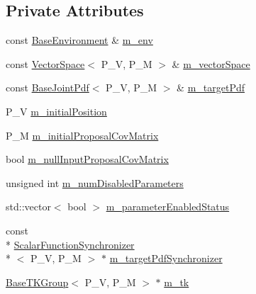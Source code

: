 \subsection*{Private Attributes}
\begin{DoxyCompactItemize}
\item 
const \hyperlink{class_q_u_e_s_o_1_1_base_environment}{Base\-Environment} \& \hyperlink{class_q_u_e_s_o_1_1_metropolis_hastings_s_g_ac8ea061e55b920e0c8f9bce5c3f20e52}{m\-\_\-env}
\item 
const \hyperlink{class_q_u_e_s_o_1_1_vector_space}{Vector\-Space}$<$ P\-\_\-\-V, P\-\_\-\-M $>$ \& \hyperlink{class_q_u_e_s_o_1_1_metropolis_hastings_s_g_a2ef17fbfc6a156f03bbfad044b5a75f5}{m\-\_\-vector\-Space}
\item 
const \hyperlink{class_q_u_e_s_o_1_1_base_joint_pdf}{Base\-Joint\-Pdf}$<$ P\-\_\-\-V, P\-\_\-\-M $>$ \& \hyperlink{class_q_u_e_s_o_1_1_metropolis_hastings_s_g_a42ce4ffcb3addf62dd3f19fe8bb09268}{m\-\_\-target\-Pdf}
\item 
P\-\_\-\-V \hyperlink{class_q_u_e_s_o_1_1_metropolis_hastings_s_g_ae29f5d1198228858283d733021da2b14}{m\-\_\-initial\-Position}
\item 
P\-\_\-\-M \hyperlink{class_q_u_e_s_o_1_1_metropolis_hastings_s_g_a4d9862afbafb34921e91de3d4610c6cd}{m\-\_\-initial\-Proposal\-Cov\-Matrix}
\item 
bool \hyperlink{class_q_u_e_s_o_1_1_metropolis_hastings_s_g_a416c5ed0c8520d23a479d4a6d3c3c083}{m\-\_\-null\-Input\-Proposal\-Cov\-Matrix}
\item 
unsigned int \hyperlink{class_q_u_e_s_o_1_1_metropolis_hastings_s_g_a43a883aa28c81ed99e5f0cd9de93889b}{m\-\_\-num\-Disabled\-Parameters}
\item 
std\-::vector$<$ bool $>$ \hyperlink{class_q_u_e_s_o_1_1_metropolis_hastings_s_g_afce8eeadae98935c72727b3640e88a31}{m\-\_\-parameter\-Enabled\-Status}
\item 
const \\*
\hyperlink{class_q_u_e_s_o_1_1_scalar_function_synchronizer}{Scalar\-Function\-Synchronizer}\\*
$<$ P\-\_\-\-V, P\-\_\-\-M $>$ $\ast$ \hyperlink{class_q_u_e_s_o_1_1_metropolis_hastings_s_g_ae7c7551764e0ccdfbe2862c544cdab10}{m\-\_\-target\-Pdf\-Synchronizer}
\item 
\hyperlink{class_q_u_e_s_o_1_1_base_t_k_group}{Base\-T\-K\-Group}$<$ P\-\_\-\-V, P\-\_\-\-M $>$ $\ast$ \hyperlink{class_q_u_e_s_o_1_1_metropolis_hastings_s_g_a26e9680abddfb793486c995fa16f8c2d}{m\-\_\-tk}
\item 

\end{DoxyCompactItemize}
